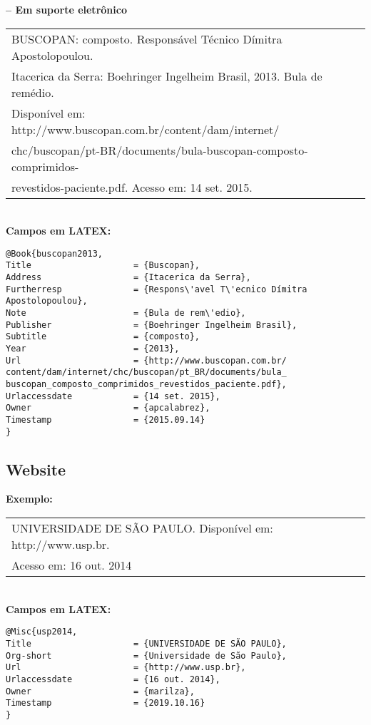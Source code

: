 \textbf{-- Em suporte eletrônico} \\

\begin{tabular}{|l|c|} \hline
	BUSCOPAN: composto. Respons\'avel T\'ecnico Dímitra Apostolopoulou.\\ Itacerica da Serra: Boehringer Ingelheim Brasil, 2013. Bula de rem\'edio. \\Disponível em: http://www.buscopan.com.br/content/dam/internet/\\chc/buscopan/pt-BR/documents/bula-buscopan-composto-comprimidos-\\revestidos-paciente.pdf. Acesso em: 14 set. 2015.
	\\\hline
\end{tabular} \\

\textbf{Campos em LATEX:} 

\begin{verbatim}
@Book{buscopan2013,
Title                    = {Buscopan},
Address                  = {Itacerica da Serra},
Furtherresp              = {Respons\'avel T\'ecnico Dímitra 
Apostolopoulou},
Note                     = {Bula de rem\'edio},
Publisher                = {Boehringer Ingelheim Brasil},
Subtitle                 = {composto},
Year                     = {2013},
Url                      = {http://www.buscopan.com.br/
content/dam/internet/chc/buscopan/pt_BR/documents/bula_
buscopan_composto_comprimidos_revestidos_paciente.pdf},
Urlaccessdate            = {14 set. 2015},
Owner                    = {apcalabrez},
Timestamp                = {2015.09.14}
}
\end{verbatim}

\subsection{Website}

\textbf{Exemplo:} \\

\begin{tabular}{|l|c|} \hline
	UNIVERSIDADE DE SÃO PAULO. Disponível em: http://www.usp.br.\\ Acesso em: 16 out. 2014
	\\\hline
\end{tabular} \\

\textbf{Campos em LATEX:} 

\begin{verbatim}
@Misc{usp2014,
Title                    = {UNIVERSIDADE DE SÃO PAULO},
Org-short                = {Universidade de São Paulo},
Url                      = {http://www.usp.br},
Urlaccessdate            = {16 out. 2014},
Owner                    = {marilza},
Timestamp                = {2019.10.16}
}
\end{verbatim}

